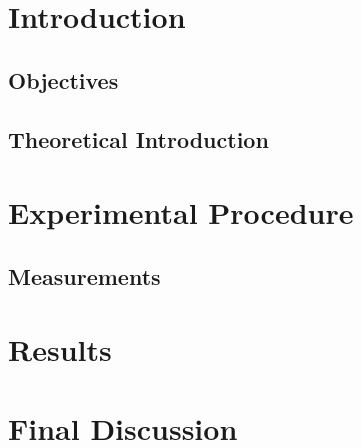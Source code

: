 \documentclass[a4paper,12pt]{article}
\begin{document}
\title{}
\author{}
\date{}
\maketitle
\abstract{}

\pagebreak 

\section{Introduction}

\subsection{Objectives}

\subsection{Theoretical Introduction}

\section{Experimental Procedure}

\subsection{Measurements}

\section{Results}

\section{Final Discussion}

\printbibliography
\end{document}
